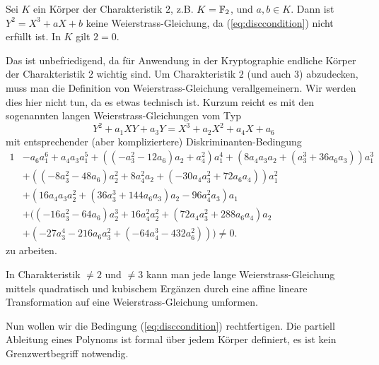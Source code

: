 \begin{bemerkung}
  Sei $K$ ein Körper der Charakteristik $2$, z.B. $K={\mathbb{F}}_2$, und
  $a,b\in K$. Dann ist $Y^2 = X^3+aX+b$ keine Weierstrass-Gleichung,
  da (\ref{eq:disccondition}) nicht erfüllt ist. In $K$ gilt $2=0$.

  Das ist  unbefriedigend, da für Anwendung in der Kryptographie
  endliche Körper 
  der Charakteristik $2$ wichtig sind. Um Charakteristik $2$ (und auch
  $3$) abzudecken, muss man die Definition von Weierstrass-Gleichung
  verallgemeinern. Wir werden dies hier nicht tun, da es etwas
  technisch ist. Kurzum reicht es mit den sogenannten langen
  Weierstrass-Gleichungen vom Typ
  \begin{equation*}
    Y^2 + a_1 XY + a_3 Y = X^3+a_2 X^2 + a_4 X + a_6
  \end{equation*}
  mit entsprechender (aber kompliziertere) Diskriminanten-Bedingung
  \begin{alignat*}1
    &-a_6 a_1^6 + a_4 a_3 a_1^5 + ((-a_3^2 - 12 a_6) a_2 + a_4^2) a_1^4 +
    (8 a_4 a_3 a_2 + (a_3^3 + 36 a_6 a_3)) a_1^3\\
    &+ ((-8 a_3^2 - 48 a_6) a_2^2 +
    8 a_4^2 a_2 +
    (-30 a_4 a_3^2 + 72 a_6 a_4)) a_1^2 \\
    &+ (16 a_4 a_3 a_2^2 +
    (36 a_3^3 + 144 a_6 a_3) a_2 - 96 a_4^2 a_3) a_1 \\
    &+ ((-16 a_3^2 -
    64 a_6) a_2^3 + 16 a_4^2 a_2^2 + (72 a_4 a_3^2 + 288 a_6 a_4) a_2
    \\
    & +
    (-27 a_3^4 - 216 a_6 a_3^2 + (-64 a_4^3 - 432 a_6^2))) \not=0.
  \end{alignat*}
  zu arbeiten.

  In Charakteristik $\not=2$ und $\not=3$ kann man jede lange
  Weierstrass-Gleichung mittels quadratisch und kubischem Ergänzen
  durch eine affine lineare Transformation auf eine
  Weierstrass-Gleichung umformen. 
\end{bemerkung}

Nun wollen wir die Bedingung (\ref{eq:disccondition}) rechtfertigen.
Die partiell Ableitung eines Polynoms ist formal über jedem Körper
definiert, es ist kein Grenzwertbegriff notwendig.

